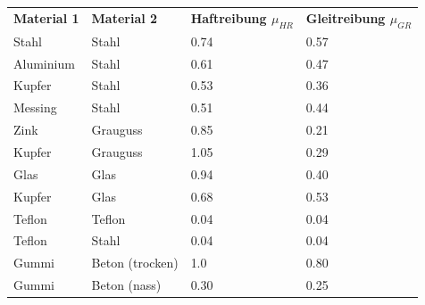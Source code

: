 \begin{footnotesize}
\begin{longtable}{llll}
  \rowcolor{white} \textbf{Material 1} & \textbf{Material 2} 
  & \textbf{Haftreibung $\mu_{HR}$} & \textbf{Gleitreibung $\mu_{GR}$}\\
  \rowcolor{lgray}  Stahl     & Stahl             & 0.74 & 0.57\\
  \rowcolor{white}  Aluminium & Stahl             & 0.61 & 0.47\\
  \rowcolor{lgray}  Kupfer    & Stahl             & 0.53 & 0.36\\
  \rowcolor{white}  Messing   & Stahl             & 0.51 & 0.44\\
  \rowcolor{lgray}  Zink      & Grauguss          & 0.85 & 0.21\\
  \rowcolor{white}  Kupfer    & Grauguss          & 1.05 & 0.29\\
  \rowcolor{lgray}  Glas      & Glas              & 0.94 & 0.40\\
  \rowcolor{white}  Kupfer    & Glas              & 0.68 & 0.53\\
  \rowcolor{lgray}  Teflon    & Teflon            & 0.04 & 0.04\\
  \rowcolor{white}  Teflon    & Stahl             & 0.04 & 0.04\\
  \rowcolor{lgray}  Gummi     & Beton (trocken)   & 1.0  & 0.80\\
  \rowcolor{white}  Gummi     & Beton (nass)      & 0.30 & 0.25
\end{longtable}
\end{footnotesize}

